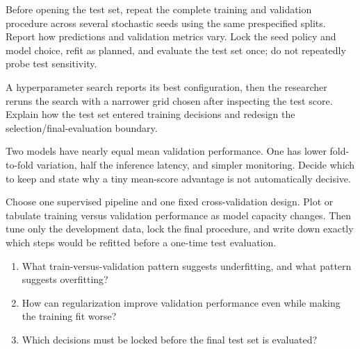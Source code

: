 \begin{tryit}
Before opening the test set, repeat the complete training and validation procedure across several stochastic seeds using the same prespecified splits. Report how predictions and validation metrics vary. Lock the seed policy and model choice, refit as planned, and evaluate the test set once; do not repeatedly probe test sensitivity.
\end{tryit}

\begin{debugtask}
A hyperparameter search reports its best configuration, then the researcher reruns the search with a narrower grid chosen after inspecting the test score. Explain how the test set entered training decisions and redesign the selection/final-evaluation boundary.
\end{debugtask}

\begin{decisionmemo}
Two models have nearly equal mean validation performance. One has lower fold-to-fold variation, half the inference latency, and simpler monitoring. Decide which to keep and state why a tiny mean-score advantage is not automatically decisive.
\end{decisionmemo}

\begin{tryit}
Choose one supervised pipeline and one fixed cross-validation design. Plot or tabulate training versus validation performance as model capacity changes. Then tune only the development data, lock the final procedure, and write down exactly which steps would be refitted before a one-time test evaluation.
\end{tryit}




\begin{quickcheck}
\begin{enumerate}
  \item What train-versus-validation pattern suggests underfitting, and what pattern suggests overfitting?
  \item How can regularization improve validation performance even while making the training fit worse?
  \item Which decisions must be locked before the final test set is evaluated?
\end{enumerate}
\end{quickcheck}


